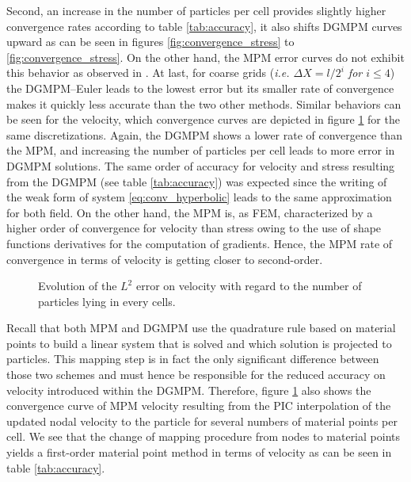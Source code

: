 Second, an increase in the number of particles per cell provides slightly higher convergence rates according to table \ref{tab:accuracy}, it also shifts DGMPM curves upward as can be seen in figures \ref{fig:convergence_stress} to \ref{fig:convergence_stress}. On the other hand, the MPM error curves do not exhibit this behavior as observed in \cite{MPM_BSpline1}. At last, for coarse grids (\textit{i.e. $\Delta X= l/2^i$ for $i \leq 4$}) the DGMPM--Euler leads to the lowest error but its smaller rate of convergence makes it quickly less accurate than the two other methods. Similar behaviors can be seen for the velocity, which convergence curves are depicted in figure \ref{fig:convergence_velocity} for the same discretizations. Again, the DGMPM shows a lower rate of convergence than the MPM, and increasing the number of particles per cell leads to more error in DGMPM solutions. The same order of accuracy for velocity and stress resulting from the DGMPM (see table \ref{tab:accuracy}) was expected since the writing of the weak form of system \eqref{eq:conv_hyperbolic} leads to the same approximation for both field. On the other hand, the MPM is, as FEM, characterized by a higher order of convergence for velocity than stress owing to the use of shape functions derivatives for the computation of gradients. Hence, the MPM rate of convergence in terms of velocity is getting closer to second-order. 

\begin{figure}[ht]
  \centering
  {\label{subfig:convV_2ppc}}
  {\label{subfig:convV_6ppc}}
  {\label{subfig:convV_10ppc}}
  {\label{subfig:convV_20ppc}}
  \caption{Evolution of the $L^2$ error on velocity with regard to the number of particles lying in every cells.}
  \label{fig:convergence_velocity}
\end{figure}
Recall that both MPM and DGMPM use the quadrature rule based on material points to build a linear system that is solved and which solution is projected to particles. This mapping step is in fact the only significant difference between those two schemes and must hence be responsible for the reduced accuracy on velocity introduced within the DGMPM. Therefore, figure \ref{fig:convergence_velocity} also shows the convergence curve of MPM velocity resulting from the PIC interpolation of the updated nodal velocity to the particle for several numbers of material points per cell. We see that the change of mapping procedure from nodes to material points yields a first-order material point method in terms of velocity as can be seen in table \ref{tab:accuracy}. 

